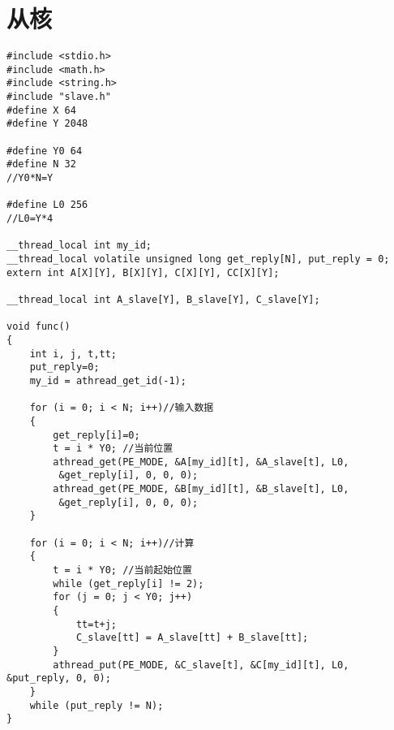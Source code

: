 \section{从核}
\begin{lstlisting}
#include <stdio.h>
#include <math.h>
#include <string.h>
#include "slave.h"
#define X 64
#define Y 2048

#define Y0 64
#define N 32
//Y0*N=Y

#define L0 256
//L0=Y*4

__thread_local int my_id;
__thread_local volatile unsigned long get_reply[N], put_reply = 0;
extern int A[X][Y], B[X][Y], C[X][Y], CC[X][Y];

__thread_local int A_slave[Y], B_slave[Y], C_slave[Y];

void func()
{
	int i, j, t,tt;
	put_reply=0;
	my_id = athread_get_id(-1);

	for (i = 0; i < N; i++)//输入数据
	{
		get_reply[i]=0;
		t = i * Y0; //当前位置
		athread_get(PE_MODE, &A[my_id][t], &A_slave[t], L0,
		 &get_reply[i], 0, 0, 0);
		athread_get(PE_MODE, &B[my_id][t], &B_slave[t], L0,
		 &get_reply[i], 0, 0, 0);
	}

	for (i = 0; i < N; i++)//计算
	{
		t = i * Y0; //当前起始位置
		while (get_reply[i] != 2);
		for (j = 0; j < Y0; j++)
		{
			tt=t+j;
			C_slave[tt] = A_slave[tt] + B_slave[tt];
		}
		athread_put(PE_MODE, &C_slave[t], &C[my_id][t], L0, &put_reply, 0, 0);
	}
	while (put_reply != N);
}
\end{lstlisting}

